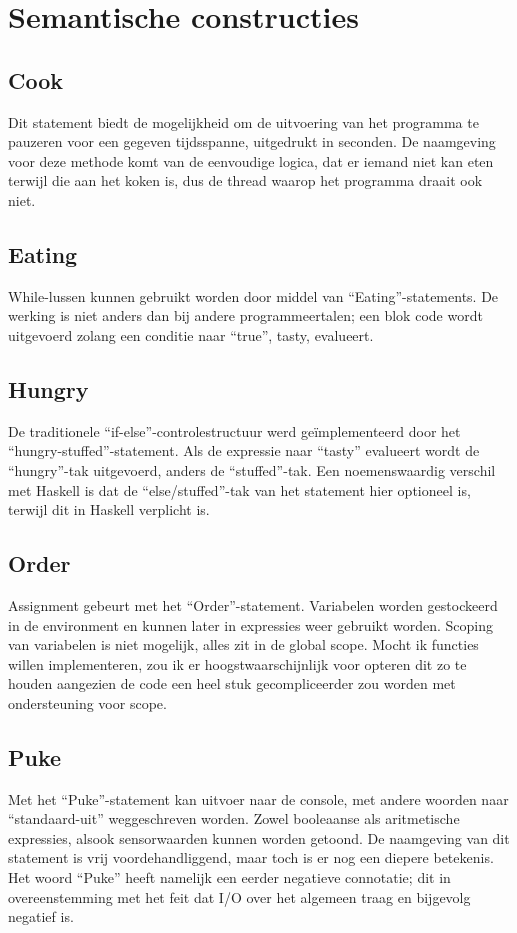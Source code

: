 \documentclass[12pt,a4paper]{report}
\begin{document}
\chapter{Semantische constructies}
\section{Cook}
Dit statement biedt de mogelijkheid om de uitvoering van het programma te pauzeren voor een gegeven tijdsspanne, uitgedrukt in seconden. De naamgeving voor deze methode komt van de eenvoudige logica, dat er iemand niet kan eten terwijl die aan het koken is, dus de thread waarop het programma draait ook niet.

\section{Eating}
While-lussen kunnen gebruikt worden door middel van ``Eating''-statements. De werking is niet anders dan bij andere programmeertalen; een blok code wordt uitgevoerd zolang een conditie naar ``true'', tasty, evalueert.

\section{Hungry}
De traditionele ``if-else''-controlestructuur werd geïmplementeerd door het ``hungry-stuffed''-statement. Als de expressie naar ``tasty'' evalueert wordt de ``hungry''-tak uitgevoerd, anders de ``stuffed''-tak. Een noemenswaardig verschil met Haskell is dat de ``else/stuffed''-tak van het statement hier optioneel is, terwijl dit in Haskell verplicht is.

\section{Order}
Assignment gebeurt met het ``Order''-statement. Variabelen worden gestockeerd in de environment en kunnen later in expressies weer gebruikt worden. Scoping van variabelen is niet mogelijk, alles zit in de global scope. Mocht ik functies willen implementeren, zou ik er hoogstwaarschijnlijk voor opteren dit zo te houden aangezien de code een heel stuk gecompliceerder zou worden met ondersteuning voor scope.

\section{Puke}
Met het ``Puke''-statement kan uitvoer naar de console, met andere woorden naar ``standaard-uit'' weggeschreven worden. Zowel booleaanse als aritmetische expressies, alsook sensorwaarden kunnen worden getoond. De naamgeving van dit statement is vrij voordehandliggend, maar toch is er nog een diepere betekenis. Het woord ``Puke'' heeft namelijk een eerder negatieve connotatie; dit in overeenstemming met het feit dat I/O over het algemeen traag en bijgevolg negatief is.
\end{document}
